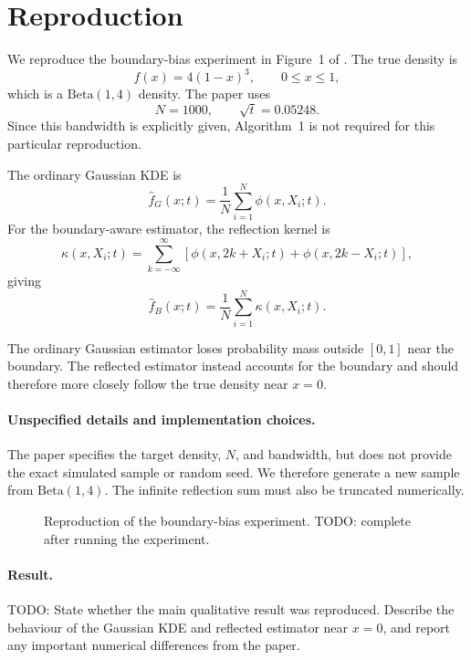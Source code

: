 \documentclass{article}
\begin{document}
\section{Reproduction}

We reproduce the boundary-bias experiment in Figure~1 of
\citet{botev2010}. The true density is
\[
f(x)=4(1-x)^3,
\qquad 0\leq x\leq1,
\]
which is a $\mathrm{Beta}(1,4)$ density. The paper uses
\[
N=1000,
\qquad
\sqrt{t}=0.05248.
\]
Since this bandwidth is explicitly given, Algorithm~1 is not required
for this particular reproduction.

The ordinary Gaussian KDE is
\[
\widehat f_G(x;t)
=
\frac{1}{N}
\sum_{i=1}^{N}
\phi(x,X_i;t).
\]
For the boundary-aware estimator, the reflection kernel is
\[
\kappa(x,X_i;t)
=
\sum_{k=-\infty}^{\infty}
\left[
\phi(x,2k+X_i;t)
+
\phi(x,2k-X_i;t)
\right],
\]
giving
\[
\widehat f_B(x;t)
=
\frac{1}{N}
\sum_{i=1}^{N}
\kappa(x,X_i;t).
\]

The ordinary Gaussian estimator loses probability mass outside
$[0,1]$ near the boundary. The reflected estimator instead accounts
for the boundary and should therefore more closely follow the true
density near $x=0$.

\paragraph{Unspecified details and implementation choices.}
The paper specifies the target density, $N$, and bandwidth, but does not
provide the exact simulated sample or random seed. We therefore generate
a new sample from $\mathrm{Beta}(1,4)$. The infinite reflection sum must
also be truncated numerically.

%

\begin{figure}[t]
  \centering
  \caption{
    Reproduction of the boundary-bias experiment.
    TODO: complete after running the experiment.
  }
  \label{fig:reproduction}
\end{figure}

\paragraph{Result.}
TODO: State whether the main qualitative result was reproduced.
Describe the behaviour of the Gaussian KDE and reflected estimator near
$x=0$, and report any important numerical differences from the paper.
\end{document}
